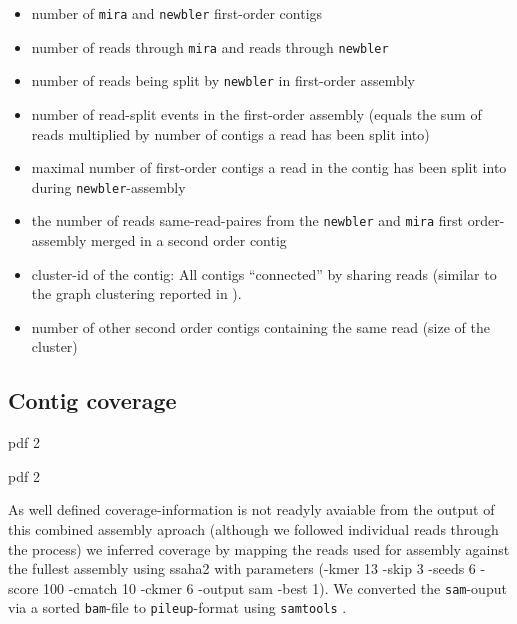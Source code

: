 \documentclass[12pt,a4paper]{article}
\begin{document}
\begin{itemize}
\item number of \texttt{mira} and \texttt{newbler} first-order contigs
\item number of reads through \texttt{mira} and reads through \texttt{newbler}
\item number of reads being split by \texttt{newbler} in first-order
  assembly 
\item number of read-split events in the first-order assembly (equals
  the sum of reads multiplied by number of contigs a read has been
  split into)
\item maximal number of first-order contigs a read in the contig has
  been split into during \texttt{newbler}-assembly 
\item the number of reads same-read-paires from the \texttt{newbler}
  and \texttt{mira} first order-assembly merged in a second order
  contig
\item cluster-id of the contig: All contigs ``connected'' by sharing
  reads (similar to the graph clustering reported in
  \cite{pmid21138572}). 
\item number of other second order contigs containing the same read
  (size of the cluster)
\end{itemize}




\subsection{Contig coverage}


\begin{Schunk}
\begin{Soutput}
pdf 
  2 
\end{Soutput}
\begin{Soutput}
pdf 
  2 
\end{Soutput}
\end{Schunk}

As well defined coverage-information is not readyly avaiable from the
output of this combined assembly aproach (although we followed
individual reads through the process) we inferred coverage by mapping
the reads used for assembly against the fullest assembly using ssaha2
\cite{pmid11591649} with parameters (-kmer 13 -skip 3 -seeds 6 -score
100 -cmatch 10 -ckmer 6 -output sam -best 1). We converted the
\texttt{sam}-ouput via a sorted \texttt{bam}-file to
\texttt{pileup}-format using \texttt{samtools}
\cite{journals/bioinformatics/LiHWFRHMAD09}.
\end{document}
